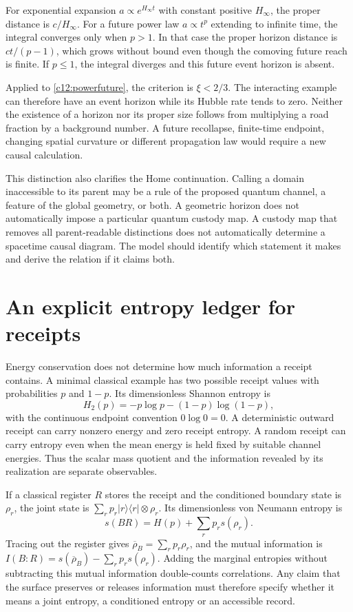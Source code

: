 For exponential expansion $a\propto e^{H_\infty t}$ with constant positive $H_\infty$, the proper distance is $c/H_\infty$. For a future power law $a\propto t^p$ extending to infinite time, the integral converges only when $p>1$. In that case the proper horizon distance is $ct/(p-1)$, which grows without bound even though the comoving future reach is finite. If $p\leq1$, the integral diverges and this future event horizon is absent.

Applied to \eqref{c12:powerfuture}, the criterion is $\xi<2/3$. The interacting example can therefore have an event horizon while its Hubble rate tends to zero. Neither the existence of a horizon nor its proper size follows from multiplying a road fraction by a background number. A future recollapse, finite-time endpoint, changing spatial curvature or different propagation law would require a new causal calculation.

This distinction also clarifies the Home continuation. Calling a domain inaccessible to its parent may be a rule of the proposed quantum channel, a feature of the global geometry, or both. A geometric horizon does not automatically impose a particular quantum custody map. A custody map that removes all parent-readable distinctions does not automatically determine a spacetime causal diagram. The model should identify which statement it makes and derive the relation if it claims both.

\section{An explicit entropy ledger for receipts}
Energy conservation does not determine how much information a receipt contains. A minimal classical example has two possible receipt values with probabilities $p$ and $1-p$. Its dimensionless Shannon entropy is
\begin{equation}
 H_2(p)=-p\log p-(1-p)\log(1-p),
 \label{c12:receiptentropy}
\end{equation}
with the continuous endpoint convention $0\log0=0$. A deterministic outward receipt can carry nonzero energy and zero receipt entropy. A random receipt can carry entropy even when the mean energy is held fixed by suitable channel energies. Thus the scalar mass quotient and the information revealed by its realization are separate observables.

If a classical register $R$ stores the receipt and the conditioned boundary state is $\rho_r$, the joint state is $\sum_r p_r|r\rangle\langle r|\otimes\rho_r$. Its dimensionless von Neumann entropy is
\begin{equation}
 s(BR)=H(p)+\sum_r p_rs(\rho_r).
 \label{c12:classicalquantumentropy}
\end{equation}
Tracing out the register gives $\overline\rho_B=\sum_rp_r\rho_r$, and the mutual information is $I(B:R)=s(\overline\rho_B)-\sum_rp_rs(\rho_r)$. Adding the marginal entropies without subtracting this mutual information double-counts correlations. Any claim that the surface preserves or releases information must therefore specify whether it means a joint entropy, a conditioned entropy or an accessible record.

